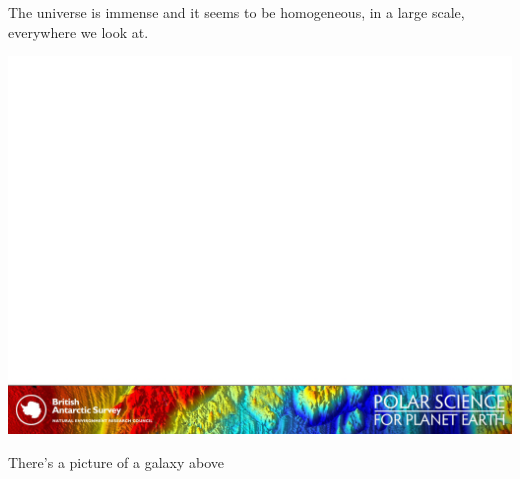 \documentclass{article}
\begin{document}
The universe is immense and it seems to be homogeneous, 
in a large scale, everywhere we look at.

\includegraphics[width=\columnwidth]{footer_1.png}

There's a picture of a galaxy above
\end{document}
